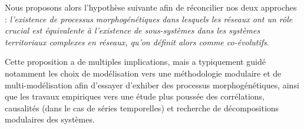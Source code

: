Nous proposons alors l'hypothèse suivante afin de réconcilier nos deux approches : \textit{l'existence de processus morphogénétiques dans lesquels les réseaux ont un rôle crucial est équivalente à l'existence de sous-systèmes dans les systèmes territoriaux complexes en réseaux, qu'on définit alors comme co-évolutifs}.

Cette proposition a de multiples implications, mais a typiquement guidé notamment les choix de modélisation vers une méthodologie modulaire et de multi-modélisation afin d'essayer d'exhiber des processus morphogénétiques, ainsi que les travaux empiriques vers une étude plus poussée des corrélations, causalités (dans le cas de séries temporelles) et recherche de décompositions modulaires des systèmes.



\stars






